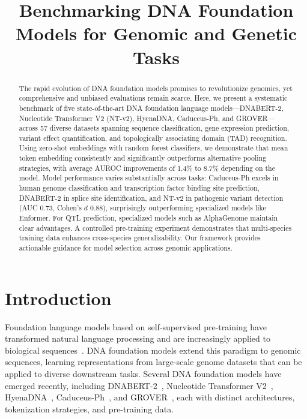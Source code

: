 \documentclass[11pt]{article}
\title{Benchmarking DNA Foundation Models for Genomic and Genetic Tasks}
\date{}
\begin{document}
\maketitle

\begin{abstract}
The rapid evolution of DNA foundation models promises to revolutionize genomics, yet comprehensive and unbiased evaluations remain scarce. Here, we present a systematic benchmark of five state-of-the-art DNA foundation language models---DNABERT-2, Nucleotide Transformer V2 (NT-v2), HyenaDNA, Caduceus-Ph, and GROVER---across 57 diverse datasets spanning sequence classification, gene expression prediction, variant effect quantification, and topologically associating domain (TAD) recognition. Using zero-shot embeddings with random forest classifiers, we demonstrate that mean token embedding consistently and significantly outperforms alternative pooling strategies, with average AUROC improvements of 1.4\% to 8.7\% depending on the model. Model performance varies substantially across tasks: Caduceus-Ph excels in human genome classification and transcription factor binding site prediction, DNABERT-2 in splice site identification, and NT-v2 in pathogenic variant detection (AUC 0.73, Cohen's $d$ 0.88), surprisingly outperforming specialized models like Enformer. For QTL prediction, specialized models such as AlphaGenome maintain clear advantages. A controlled pre-training experiment demonstrates that multi-species training data enhances cross-species generalizability. Our framework provides actionable guidance for model selection across genomic applications.
\end{abstract}

\section{Introduction}

Foundation language models based on self-supervised pre-training have transformed natural language processing and are increasingly applied to biological sequences~\citep{achiam2023gpt4,touvron2023llama}. DNA foundation models extend this paradigm to genomic sequences, learning representations from large-scale genome datasets that can be applied to diverse downstream tasks. Several DNA foundation models have emerged recently, including DNABERT-2~\citep{zhou2024dnabert2}, Nucleotide Transformer V2~\citep{dallatorre2023nucleotide}, HyenaDNA~\citep{nguyen2024hyenadna}, Caduceus-Ph~\citep{schiff2024caduceus}, and GROVER~\citep{sanabria2024grover}, each with distinct architectures, tokenization strategies, and pre-training data.
\end{document}

